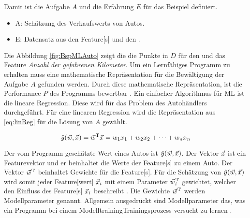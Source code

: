 Damit ist die Aufgabe \(A\) und die Erfahrung \(E\) für das Beispiel definiert. 

\begin{itemize}
    \item A: Schätzung des Verkaufswerts von Autos.
    \item E: Datensatz aus den \gls{Feature}[s] und den .
\end{itemize}


Die Abbildung \ref{fig:BspMLAuto} zeigt die die Punkte in \(D\) für den  und das \gls{Feature} \textit{Anzahl der gefahrenen Kilometer}. Um ein Lernfähiges Programm zu erhalten muss eine mathematische Repräsentation für die Bewältigung der Aufgabe \(A\) gefunden werden. Durch diese mathematische Repräsentation, ist die Performance \(P\) des Programms bewertbar \cite{Mitchell.1997}. Ein einfacher Algorithmus für \gls{ML} ist die lineare Regression. Diese wird für das Problem des Autohändlers durchgeführt. Für eine linearen Regression wird die Repräsentation aus \ref{eq:linReg} für die Lösung von \(A\) gewählt.

\begin{equation}
    \label{eq:linReg}
    \hat{y}(\vec{w}, \vec{x}) =  \vec{w}^\mathrm{T}\vec{x} = w_1x_1 + w_2x_2 + \dots + w_nx_n
\end{equation}

Der vom Programm geschätzte Wert eines Autos ist \(\hat{y}(\vec{w}, \vec{x})\). Der Vektor \(\vec{x}\) ist ein \gls{Featurevektor} und er beinhaltet die Werte der \gls{Feature}[s] zu einem Auto. Der Vektor \(\vec{w}^\mathrm{T}\) beinhaltet Gewichte für die \gls{Feature}[s]. Für die Schätzung von \(\hat{y}(\vec{w}, \vec{x})\) wird somit jeder \gls{Feature}[wert] \(\vec{x}_i\) mit einem Parameter \(\vec{w}^\mathrm{T}_i\) gewichtet, welcher den Einfluss des \gls{Feature}[s] \(\vec{x}_i\) beschreibt \cite{Goodfellow.2016}. Die Gewichte \(\vec{w}^\mathrm{T}\) werden \gls{Modellparameter} genannt. Allgemein ausgedrückt sind \gls{Modellparameter} das, was ein Programm bei einem \gls{Modelltraining}{Trainingsprozess} versucht zu lernen \cite{Zheng.2015}. \par

